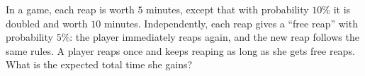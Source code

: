 In a game, each reap is worth $5$ minutes, except that with probability $10\%$ it is doubled and worth $10$ minutes. Independently, each reap gives a ``free reap'' with probability $5\%$: the player immediately reaps again, and the new reap follows the same rules. A player reaps once and keeps reaping as long as she gets free reaps. What is the expected total time she gains?

